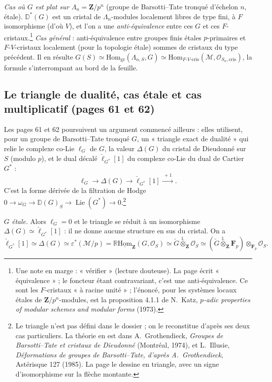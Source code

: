 \documentclass[11pt,a4paper]{article}
\begin{document}
\emph{Cas où $G$ est plat sur $\Lambda_n = \mathbf{Z}/p^n$} (groupe de
Barsotti--Tate tronqué d'échelon $n$, étale). $\mathbb{D}^*(G)$ est un cristal
de $\Lambda_n$-modules localement libres de type fini, à $F$ isomorphisme (d'où
$V$), et l'on a une \emph{anti-équivalence} entre ces $G$ et ces
$F$-cristaux.\footnote{Une note en marge : « vérifier » (lecture douteuse). La
page écrit « équivalence » ; le foncteur étant contravariant, c'est une
anti-équivalence. Ce sont les $F$-cristaux « à racine unité » ; l'énoncé, pour
les systèmes locaux étales de $\mathbf{Z}/p^n$-modules, est la proposition 4.1.1
de N.~Katz, \emph{$p$-adic properties of modular schemes and modular forms}
(1973).} \emph{Cas général} : anti-équivalence entre groupes finis étales
$p$-primaires et $F$-$V$-cristaux localement (pour la topologie étale) sommes
de cristaux du type précédent. Il en résulte
$G(S) \simeq \mathrm{Hom}_{\mathrm{gr}}(\Lambda_{n,S}, G) \simeq
\mathrm{Hom}_{F\text{-}V\text{-cris}}(\mathcal{M}, \mathcal{O}_{S_n,\mathrm{cris}})$,
la formule s'interrompant au bord de la feuille.

\subsection*{Le triangle de dualité, cas étale et cas multiplicatif (pages 61 et 62)}

Les pages 61 et 62 poursuivent un argument commencé ailleurs : elles utilisent,
pour un groupe de Barsotti--Tate tronqué $G$, un « triangle exact de dualité »
qui relie le complexe co-Lie $\ell_G$ de $G$, la valeur $\Delta(G)$ du cristal
de Dieudonné sur $S$ (modulo $p$), et le dual décalé $\check\ell_{G^*}[1]$ du
complexe co-Lie du dual de Cartier $G^*$ :
\[
  \ell_G \longrightarrow \Delta(G) \longrightarrow \check\ell_{G^*}[1]
  \xrightarrow{\;+1\;} .
\]
C'est la forme dérivée de la filtration de Hodge
$0 \to \omega_G \to \mathbb{D}(G)_S \to \operatorname{Lie}(G^*) \to 0$.\footnote{Le
triangle n'est pas défini dans le dossier ; on le reconstitue d'après ses deux
cas particuliers. La théorie en est dans A.~Grothendieck, \emph{Groupes de
Barsotti--Tate et cristaux de Dieudonné} (Montréal, 1974), et L.~Illusie,
\emph{Déformations de groupes de Barsotti--Tate, d'après A.~Grothendieck},
Astérisque 127 (1985). La page le dessine en triangle, avec un signe
d'isomorphisme sur la flèche montante.}

\emph{$G$ étale.} Alors $\ell_G = 0$ et le triangle se réduit à un
isomorphisme $\Delta(G) \simeq \check\ell_{G^*}[1]$ : il ne donne aucune
structure en sus du cristal. On a
\[
  \check\ell_{G^*}[1] \simeq \Delta(G) \simeq \varepsilon^*(\mathcal{M}/p)
  = \mathbb{R}\underline{\mathrm{Hom}}_{\mathbf{Z}}(G, \mathcal{O}_S)
  \simeq \check G \overset{\mathbb{L}}{\otimes}_{\mathbf{Z}} \mathcal{O}_S
  \simeq (\check G \overset{\mathbb{L}}{\otimes}_{\mathbf{Z}} \mathbf{F}_p)
  \otimes_{\mathbf{F}_p} \mathcal{O}_S .
\]
\end{document}
